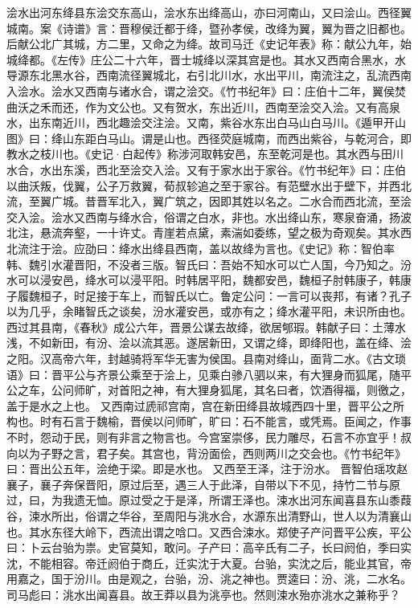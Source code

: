 \documentclass[12pt,UTF8]{ctexbook}
\begin{document}
浍水出河东绛县东浍交东高山，浍水东出绛高山，亦曰河南山，又曰浍山。西径翼城南。案《诗谱》言：晋穆侯迁都于绛，暨孙孝侯，改绛为翼，翼为晋之旧都也。后献公北广其城，方二里，又命之为绛。故司马迁《史记年表》称：献公九年，始城绛都。《左传》庄公二十六年，晋士城绛以深其宫是也。其水又西南合黑水，水导源东北黑水谷，西南流径翼城北，右引北川水，水出平川，南流注之，乱流西南入浍水。浍水又西南与诸水合，谓之浍交。《竹书纪年》曰：庄伯十二年，翼侯焚曲沃之禾而还，作为文公也。又有贺水，东出近川，西南至浍交入浍。又有高泉水，出东南近川，西北趣浍交注浍。又南，紫谷水东出白马山白马川。《遁甲开山图》曰：绛山东距白马山。谓是山也。西径荧庭城南，而西出紫谷，与乾河合，即教水之枝川也。《史记·白起传》称涉河取韩安邑，东至乾河是也。其水西与田川水合，水出东溪，西北至浍交入浍。又有于家水出于家谷。《竹书纪年》曰：庄伯以曲沃叛，伐翼，公子万救翼，荀叔轸追之至于家谷。有范壁水出于壁下，并西北流，至翼广城。昔晋军北入，翼广筑之，因即其姓以名之。二水合而西北流，至浍交入浍。浍水又西南与绛水合，俗谓之白水，非也。水出绛山东，寒泉奋涌，扬波北注，悬流奔壑，一十许丈。青崖若点黛，素湍如委练，望之极为奇观矣。其水西北流注于浍。应劭曰：绛水出绛县西南，盖以故绛为言也。《史记》称：智伯率韩、魏引水灌晋阳，不没者三版。智氏曰：吾始不知水可以亡人国，今乃知之。汾水可以浸安邑，绛水可以浸平阳。时韩居平阳，魏都安邑，魏桓子肘韩康子，韩康子履魏桓子，时足接于车上，而智氏以亡。鲁定公问：一言可以丧邦，有诸？孔子以为几乎，余睹智氏之谈矣，汾水灌安邑，或亦有之；绛水灌平阳，未识所由也。
西过其县南，《春秋》成公六年，晋景公谋去故绛，欲居郇瑕。韩献子曰：土薄水浅，不如新田，有汾、浍以流其恶。遂居新田，又谓之绛，即绛阳也，盖在绛、浍之阳。汉高帝六年，封越骑将军华无害为侯国。县南对绛山，面背二水。《古文琐语》曰：晋平公与齐景公乘至于浍上，见乘白骖八驷以来，有大狸身而狐尾，随平公之车，公问师旷，对首阳之神，有大狸身狐尾，其名曰者，饮酒得福，则徼之，盖于是水之上也。
又西南过虒祁宫南，宫在新田绛县故城西四十里，晋平公之所构也。时有石言于魏榆，晋侯以问师旷，旷曰：石不能言，或凭焉。臣闻之，作事不时，怨动于民，则有非言之物言也。今宫室崇侈，民力雕尽，石言不亦宜乎！叔向以为子野之言，君子矣。其宫也，背汾面侩，西则两川之交会也。《竹书纪年》曰：晋出公五年，浍绝于梁。即是水也。
又西至王泽，注于汾水。
晋智伯瑶攻赵襄子，襄子奔保晋阳，原过后至，遇三人于此泽，自带以下不见，持竹二节与原过，曰，为我遗无恤。原过受之于是泽，所谓王泽也。涑水出河东闻喜县东山黍葭谷，涑水所出，俗谓之华谷，至周阳与洮水合，水源东出清野山，世人以为清襄山也。其水东径大岭下，西流出谓之唅口。又西合涑水。郑使子产问晋平公疾，平公曰：卜云台骀为祟。史官莫知，敢问。子产曰：高辛氏有二子，长曰阏伯，季曰实沈，不能相容。帝迁阏伯于商丘，迁实沈于大夏。台骀，实沈之后，能业其官，帝用嘉之，国于汾川。由是观之，台骀，汾、洮之神也。贾逵曰：汾、洮，二水名。司马彪曰：洮水出闻喜县。故王莽以县为洮亭也。然则涑水殆亦洮水之兼称乎？
\end{document}
